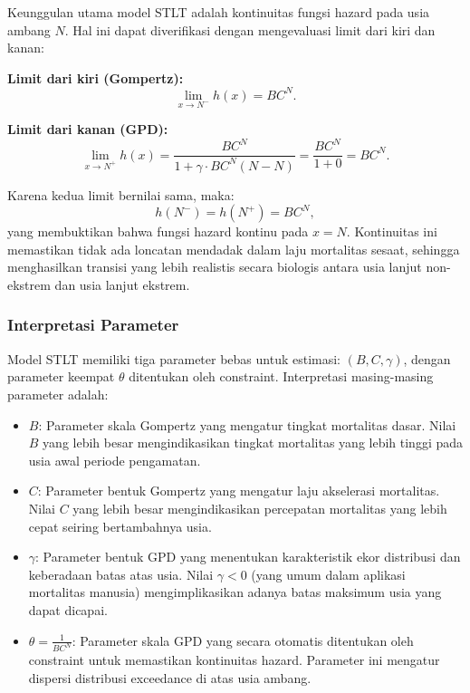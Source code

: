 Keunggulan utama model STLT adalah kontinuitas fungsi hazard pada usia ambang $N$. Hal ini dapat diverifikasi dengan mengevaluasi limit dari kiri dan kanan:

\textbf{Limit dari kiri (Gompertz):}
\begin{equation}
\lim_{x \to N^-} h(x) = BC^N.
\label{eq:hazard_left_limit}
\end{equation}

\textbf{Limit dari kanan (GPD):}
\begin{equation}
\lim_{x \to N^+} h(x) = \frac{BC^N}{1 + \gamma \cdot BC^N(N-N)} = \frac{BC^N}{1 + 0} = BC^N.
\label{eq:hazard_right_limit}
\end{equation}

Karena kedua limit bernilai sama, maka:
\begin{equation}
h(N^-) = h(N^+) = BC^N,
\label{eq:hazard_continuity}
\end{equation}
yang membuktikan bahwa fungsi hazard kontinu pada $x = N$. Kontinuitas ini memastikan tidak ada loncatan mendadak dalam laju mortalitas sesaat, sehingga menghasilkan transisi yang lebih realistis secara biologis antara usia lanjut non-ekstrem dan usia lanjut ekstrem.

\subsubsection{Interpretasi Parameter}

Model STLT memiliki tiga parameter bebas untuk estimasi: $(B, C, \gamma)$, dengan parameter keempat $\theta$ ditentukan oleh constraint. Interpretasi masing-masing parameter adalah:

\begin{itemize}
    \item \textbf{$B$}: Parameter skala Gompertz yang mengatur tingkat mortalitas dasar. Nilai $B$ yang lebih besar mengindikasikan tingkat mortalitas yang lebih tinggi pada usia awal periode pengamatan.
    
    \item \textbf{$C$}: Parameter bentuk Gompertz yang mengatur laju akselerasi mortalitas. Nilai $C$ yang lebih besar mengindikasikan percepatan mortalitas yang lebih cepat seiring bertambahnya usia.
    
    \item \textbf{$\gamma$}: Parameter bentuk GPD yang menentukan karakteristik ekor distribusi dan keberadaan batas atas usia. Nilai $\gamma < 0$ (yang umum dalam aplikasi mortalitas manusia) mengimplikasikan adanya batas maksimum usia yang dapat dicapai.
    
    \item \textbf{$\theta = \frac{1}{BC^N}$}: Parameter skala GPD yang secara otomatis ditentukan oleh constraint untuk memastikan kontinuitas hazard. Parameter ini mengatur dispersi distribusi exceedance di atas usia ambang.
\end{itemize}

